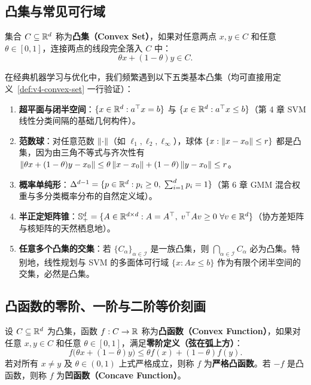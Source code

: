 \subsection{凸集与常见可行域}

\begin{defBox}
\begin{definition}[凸集]\label{def:v4-convex-set}
集合 $C \subseteq \mathbb{R}^d$ 称为\textbf{凸集（Convex Set）}，如果对任意两点 $x, y \in C$ 和任意 $\theta \in [0, 1]$，连接两点的线段完全落入 $C$ 中：
\[
  \theta x + (1-\theta) y \in C.
\]
\end{definition}
\end{defBox}

在经典机器学习与优化中，我们频繁遇到以下五类基本凸集（均可直接用定义~\ref{def:v4-convex-set} 一行验证）：
\begin{enumerate}
  \item \textbf{超平面与闭半空间}：$\{x \in \mathbb{R}^d : a^\top x = b\}$ 与 $\{x \in \mathbb{R}^d : a^\top x \le b\}$（第 4 章 SVM 线性分类间隔的基础几何构件）。
  \item \textbf{范数球}：对任意范数 $\left\|\cdot\right\|$（如 $\ell_1, \ell_2, \ell_\infty$），球体 $\{x : \left\|x - x_0\right\| \le r\}$ 都是凸集，因为由三角不等式与齐次性有 $\left\|\theta x + (1-\theta)y - x_0\right\| \le \theta\left\|x-x_0\right\| + (1-\theta)\left\|y-x_0\right\| \le r$。
  \item \textbf{概率单纯形}：$\Delta^{d-1} = \{p \in \mathbb{R}^d : p_i \ge 0,\; \sum_{i=1}^d p_i = 1\}$（第 6 章 GMM 混合权重与多分类概率分布的自然定义域）。
  \item \textbf{半正定矩阵锥}：$\mathbb{S}_+^d = \{A \in \mathbb{R}^{d\times d} : A = A^\top,\; v^\top A v \ge 0\ \forall v\in\mathbb{R}^d\}$（协方差矩阵与核矩阵的天然栖息地）。
  \item \textbf{任意多个凸集的交集}：若 $\{C_\alpha\}_{\alpha \in \mathcal{I}}$ 是一族凸集，则 $\bigcap_{\alpha \in \mathcal{I}} C_\alpha$ 必为凸集。特别地，线性规划与 SVM 的多面体可行域 $\{x : Ax \le b\}$ 作为有限个闭半空间的交集，必然是凸集。
\end{enumerate}

\subsection{凸函数的零阶、一阶与二阶等价刻画}

\begin{defBox}
\begin{definition}[凸函数与严格凸函数]\label{def:v4-convex-fn}
设 $C \subseteq \mathbb{R}^d$ 为凸集，函数 $f: C \to \mathbb{R}$ 称为\textbf{凸函数（Convex Function）}，如果对任意 $x, y \in C$ 和任意 $\theta \in [0, 1]$，满足\textbf{零阶定义（弦在弧上方）}：
\begin{equation}\label{eq:v4-jensen2}
  f\big(\theta x + (1-\theta)y\big) \le \theta f(x) + (1-\theta)f(y).
\end{equation}
若对所有 $x \neq y$ 及 $\theta \in (0, 1)$ 上式严格成立，则称 $f$ 为\textbf{严格凸函数}。若 $-f$ 是凸函数，则称 $f$ 为\textbf{凹函数（Concave Function）}。
\end{definition}
\end{defBox}

